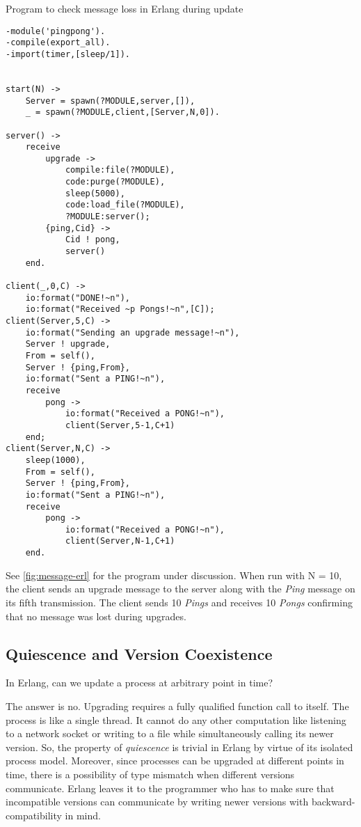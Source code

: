 \begin{program}
\caption[Program to check message loss in Erlang]
{Program to check message loss in Erlang during update}
\label{fig:message-erl}

\begin{verbatim}
-module('pingpong').
-compile(export_all).
-import(timer,[sleep/1]).


start(N) ->
    Server = spawn(?MODULE,server,[]),
    _ = spawn(?MODULE,client,[Server,N,0]).

server() ->
    receive
        upgrade ->
            compile:file(?MODULE),
            code:purge(?MODULE),
            sleep(5000),
            code:load_file(?MODULE),
            ?MODULE:server();
        {ping,Cid} ->
            Cid ! pong,
            server()
    end.

client(_,0,C) ->
    io:format("DONE!~n"),
    io:format("Received ~p Pongs!~n",[C]);
client(Server,5,C) ->
    io:format("Sending an upgrade message!~n"),
    Server ! upgrade,
    From = self(),
    Server ! {ping,From},
    io:format("Sent a PING!~n"),
    receive
        pong ->
            io:format("Received a PONG!~n"),
            client(Server,5-1,C+1)
    end;
client(Server,N,C) ->
    sleep(1000),
    From = self(),
    Server ! {ping,From},
    io:format("Sent a PING!~n"),
    receive
        pong ->
            io:format("Received a PONG!~n"),
            client(Server,N-1,C+1)
    end.
\end{verbatim}
\end{program}

See \autoref{fig:message-erl} for the program under discussion. When run
with N = 10, the client sends an upgrade message to the server along
with the \emph{Ping} message on its fifth transmission. The client
sends 10 \emph{Pings} and receives 10 \emph{Pongs} confirming that no
message was lost during upgrades.

\subsection{Quiescence and Version Coexistence}

In Erlang, can we update a process at arbitrary point in time?

The answer is no. Upgrading requires a fully qualified function call
to itself. The process is like a single thread. It cannot do any other
computation like listening to a network socket or writing to a file
while simultaneously calling its newer version. So, the property of
\emph{quiescence} is trivial in Erlang by virtue of its isolated
process model. Moreover, since processes can be upgraded at different
points in time, there is a possibility of type mismatch when different
versions communicate. Erlang leaves it to the programmer who has to
make sure that incompatible versions can communicate by writing newer
versions with backward-compatibility in mind.

